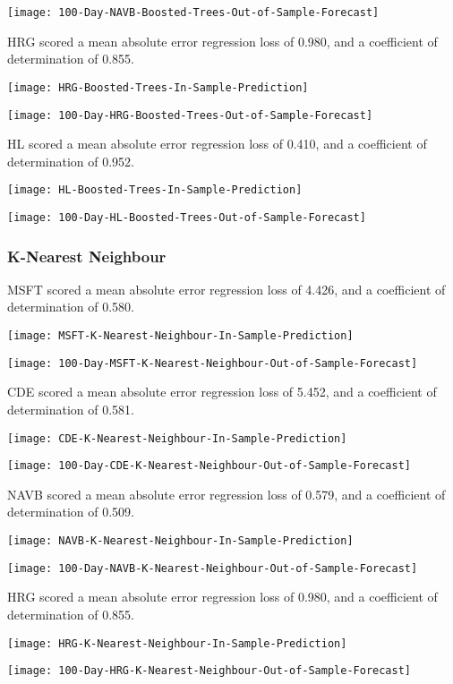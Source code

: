 \texttt{[image: 100-Day-NAVB-Boosted-Trees-Out-of-Sample-Forecast]}

HRG scored a mean absolute error regression loss of 0.980, and a coefficient of determination of 0.855.

\texttt{[image: HRG-Boosted-Trees-In-Sample-Prediction]}

\texttt{[image: 100-Day-HRG-Boosted-Trees-Out-of-Sample-Forecast]}

HL scored a mean absolute error regression loss of 0.410, and a coefficient of determination of 0.952.

\texttt{[image: HL-Boosted-Trees-In-Sample-Prediction]}

\texttt{[image: 100-Day-HL-Boosted-Trees-Out-of-Sample-Forecast]}

\subsubsection{K-Nearest Neighbour}
MSFT scored a mean absolute error regression loss of 4.426, and a coefficient of determination of 0.580.

\texttt{[image: MSFT-K-Nearest-Neighbour-In-Sample-Prediction]}

\texttt{[image: 100-Day-MSFT-K-Nearest-Neighbour-Out-of-Sample-Forecast]}

CDE scored a mean absolute error regression loss of 5.452, and a coefficient of determination of 0.581.

\texttt{[image: CDE-K-Nearest-Neighbour-In-Sample-Prediction]}

\texttt{[image: 100-Day-CDE-K-Nearest-Neighbour-Out-of-Sample-Forecast]}

NAVB scored a mean absolute error regression loss of 0.579, and a coefficient of determination of 0.509.

\texttt{[image: NAVB-K-Nearest-Neighbour-In-Sample-Prediction]}

\texttt{[image: 100-Day-NAVB-K-Nearest-Neighbour-Out-of-Sample-Forecast]}

HRG scored a mean absolute error regression loss of 0.980, and a coefficient of determination of 0.855.

\texttt{[image: HRG-K-Nearest-Neighbour-In-Sample-Prediction]}

\texttt{[image: 100-Day-HRG-K-Nearest-Neighbour-Out-of-Sample-Forecast]}

